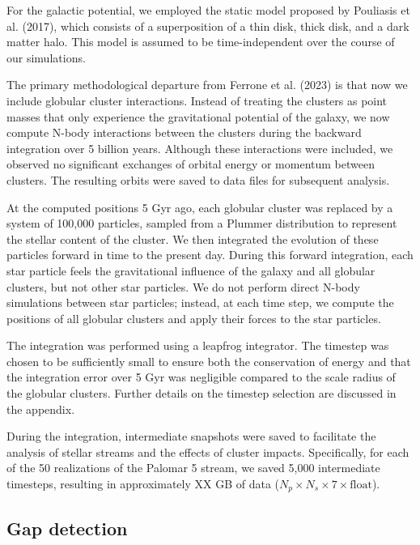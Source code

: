\documentclass[]{aa}
\begin{document}
    For the galactic potential, we employed the static model proposed by Pouliasis et al. (2017), which consists of a superposition of a thin disk, thick disk, and a dark matter halo. This model is assumed to be time-independent over the course of our simulations.

    The primary methodological departure from Ferrone et al. (2023) is that now we include globular cluster interactions. Instead of treating the clusters as point masses that only experience the gravitational potential of the galaxy, we now compute N-body interactions between the clusters during the backward integration over 5 billion years. Although these interactions were included, we observed no significant exchanges of orbital energy or momentum between clusters. The resulting orbits were saved to data files for subsequent analysis.

    At the computed positions 5 Gyr ago, each globular cluster was replaced by a system of 100,000 particles, sampled from a Plummer distribution to represent the stellar content of the cluster. We then integrated the evolution of these particles forward in time to the present day. During this forward integration, each star particle feels the gravitational influence of the galaxy and all globular clusters, but not other star particles. We do not perform direct N-body simulations between star particles; instead, at each time step, we compute the positions of all globular clusters and apply their forces to the star particles.

    The integration was performed using a leapfrog integrator. The timestep was chosen to be sufficiently small to ensure both the conservation of energy and that the integration error over 5 Gyr was negligible compared to the scale radius of the globular clusters. Further details on the timestep selection are discussed in the appendix.

    During the integration, intermediate snapshots were saved to facilitate the analysis of stellar streams and the effects of cluster impacts. Specifically, for each of the 50 realizations of the Palomar 5 stream, we saved 5,000 intermediate timesteps, resulting in approximately XX GB of data ($N_p \times N_s \times 7 \times \text{float}$).




  \subsection{Gap detection}
\end{document}

